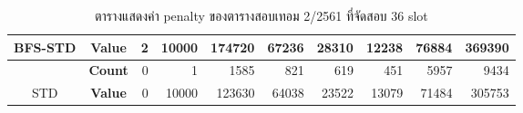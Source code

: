 \begin{table}[]
{\begin{tabular}{@{}ccrrrrrrrr@{}}
    \multirow{-2}{*}{BFS-STD}                    & \textbf{Value}                        & 2                              & 10000                          & 174720                         & 67236                          & 28310                          & 12238                          & 76884                          & 369390                           \\ \midrule
                                                  & {\textbf{Count}} & {0}       & {1}       & {1585}    & {821}     & {619}     & {451}     & {5957}    & {9434}      \\ \cmidrule(l){2-10} 
    \multirow{-2}{*}{STD} & {\textbf{Value}} & {0}       & {10000}   & {123630}  & {64038}   & {23522}   & {13079}   & {71484}   & {305753}    \\ \bottomrule
    \end{tabular}%
    }
    \caption{ตารางแสดงค่า penalty ของตารางสอบเทอม 2/2561 ที่จัดสอบ 36 slot}
    \label{tab:result_table_261_36}
\end{table}
